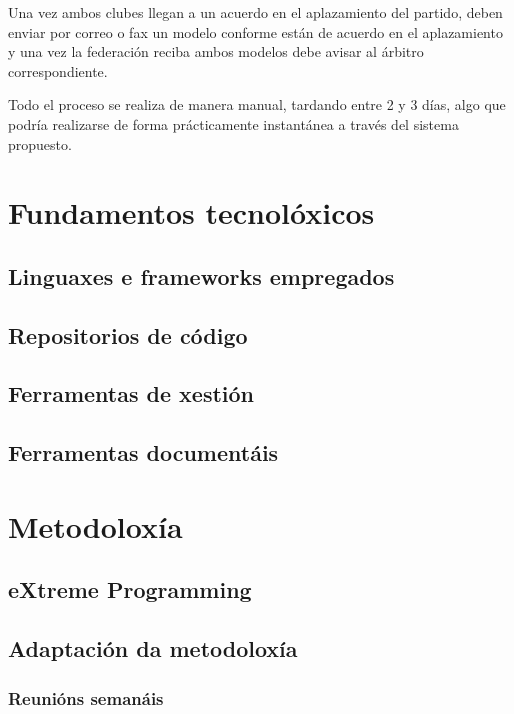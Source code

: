 \documentclass[a4paper,spanish,10p,titlepage]{report}
\begin{document}
Una vez ambos clubes llegan a un acuerdo en el aplazamiento del partido, deben enviar por 
correo o 
fax un modelo conforme están de acuerdo en el aplazamiento y una vez la 
federación reciba ambos modelos debe avisar al árbitro correspondiente.

Todo el proceso se realiza de manera manual, tardando entre 2 y 3 días, algo que podría 
realizarse 
de forma prácticamente instantánea a través del sistema propuesto.  

\clearpage


\chapter{Fundamentos tecnolóxicos}
  \section{Linguaxes e frameworks empregados}
  \section{Repositorios de código}
  \section{Ferramentas de xestión}
  \section{Ferramentas documentáis}

\clearpage


\chapter{Metodoloxía}

  \section{eXtreme Programming}

  \section{Adaptación da metodoloxía}
    \subsection{Reunións semanáis}
    
\end{document}
